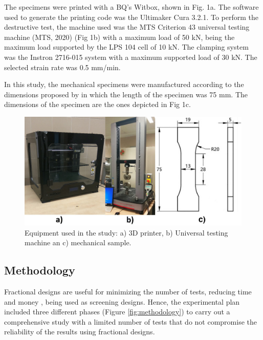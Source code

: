 \documentclass[]{interact}
\theoremstyle{plain}%
\theoremstyle{definition}
\theoremstyle{remark}
\begin{document}
The specimens were printed with a BQ's Witbox, shown in Fig. 1a. The
software used to generate the printing code was the Ultimaker Cura
3.2.1. To perform the destructive test, the machine used was the MTS
Criterion 43 universal testing machine (MTS, 2020) (Fig 1b) with a
maximum load of 50 kN, being the maximum load supported by the LPS 104
cell of 10 kN. The clamping system was the Instron 2716-015 system with
a maximum supported load of 30 kN. The selected strain rate was 0.5
mm/min.

In this study, the mechanical specimens were manufactured according to
the dimensions proposed by \citet{Lin2018} in which the length of the
specimen was 75 mm. The dimensions of the specimen are the ones depicted
in Fig 1c.

\begin{figure}

{\centering \includegraphics[width=0.9\linewidth]{Figures/Machine-probeta} 

}

\caption{Equipment used in the study: a) 3D printer, b) Universal testing machine an c) mechanical sample.}\label{fig:Fig.machine}
\end{figure}

\hypertarget{methodology}{%
\subsection{Methodology}\label{methodology}}

Fractional designs are useful for minimizing the number of tests,
reducing time and money \citep{Montgomery2001}, being used as screening
designs. Hence, the experimental plan included three different phases
(Figure \ref{fig:methodology}) to carry out a comprehensive study with a
limited number of tests that do not compromise the reliability of the
results using fractional designs.
\end{document}

